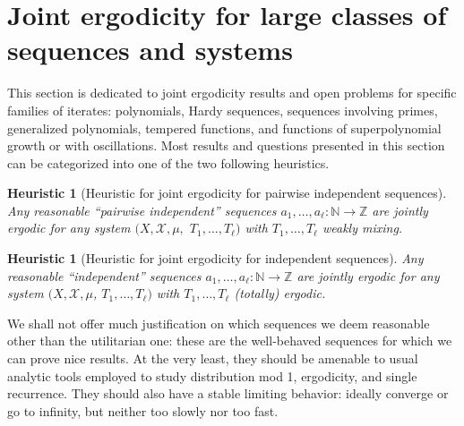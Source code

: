\documentclass[11pt]{amsart}
\newtheorem{heuristic}[lemma]{Heuristic}
\theoremstyle{definition}
\newcommand{\N}{{\mathbb N}}
\newcommand{\Z}{{\mathbb Z}}
\newcommand{\CX}{{\mathcal X}}
\newcommand{\1}{{\mathbf{1}}}
\begin{document}
\section{Joint ergodicity for large classes of sequences and systems}\label{S: joint ergodicity for large classes}
This section is dedicated to joint ergodicity results and open problems for specific families of iterates: polynomials, Hardy sequences, sequences involving primes, generalized polynomials, tempered functions, and functions of superpolynomial growth or with oscillations. Most results and questions presented in this section can be categorized into one of the two following heuristics.
\begin{heuristic}[Heuristic for joint ergodicity for pairwise independent sequences]\label{H: pairwise independent}
    Any reasonable ``pairwise independent'' sequences $a_1, \ldots, a_\ell:\N\to\Z$ are jointly ergodic for any system $(X, \CX, \mu,$\! $T_1, \ldots, T_\ell)$ with $T_1, \ldots, T_\ell$ weakly mixing.
\end{heuristic}

\begin{heuristic}[Heuristic for joint ergodicity for independent sequences]\label{H: independent}
    Any reasonable ``independent'' sequences $a_1, \ldots, a_\ell:\N\to\Z$ are jointly ergodic for any system $(X, \CX, \mu$, $T_1, \ldots, T_\ell)$ with $T_1, \ldots, T_\ell$ (totally) ergodic.
\end{heuristic}
We shall not offer much justification on which sequences we deem reasonable other than the utilitarian one: these are the well-behaved sequences for which we can prove nice results. At the very least, they should be amenable to usual analytic tools employed to study distribution mod 1, ergodicity, and single recurrence. They should also have a stable limiting behavior: ideally converge or go to infinity, but neither too slowly nor too fast. 
\end{document}
